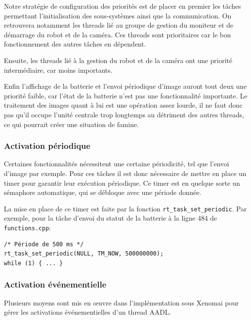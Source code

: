 \documentclass[11pt, a4paper]{paper}
\begin{document}
Notre stratégie de configuration des priorités est de placer en premier les tâches permettant l'initialisation des sous-systèmes ainsi que la communication. On retrouvera notamment les threads lié au groupe de gestion du moniteur et de démarrage du robot et de la caméra. Ces threads sont prioritaires car le bon fonctionnement des autres tâches en dépendent.

Ensuite, les threads lié à la gestion du robot et de la caméra ont une priorité intermédiaire, car moins importants.

Enfin l'affichage de la batterie et l'envoi périodique d'image auront tout deux une priorité faible, car l'état de la batterie n'est pas une fonctionnalité importante. Le traitement des images quant à lui est une opération assez lourde, il ne faut donc pas qu'il occupe l'unité centrale trop longtemps au détriment des autres threads, ce qui pourrait créer une situation de famine.

\subsubsection{Activation périodique}
Certaines fonctionnalités nécessitent une certaine périodicité, tel que l'envoi d'image par exemple. Pour ces tâches il est donc nécessaire de mettre en place un timer pour garantir leur exécution périodique. Ce timer est en quelque sorte un sémaphore automatique, qui se débloque avec une période donnée.

La mise en place de ce timer est faite par la fonction {\tt rt\_task\_set\_periodic}.
Par exemple, pour la tâche d'envoi du statut de la batterie à la ligne 484 de {\tt functions.cpp}:

\begin{verbatim}
/* Période de 500 ms */
rt_task_set_periodic(NULL, TM_NOW, 500000000);
while (1) { ... }
\end{verbatim}

\subsubsection{Activation événementielle}
Plusieurs moyens sont mis en {\oe}uvre dans l'implémentation sous Xenomai pour gérer les activations événementielles d'un thread AADL. 
\end{document}
